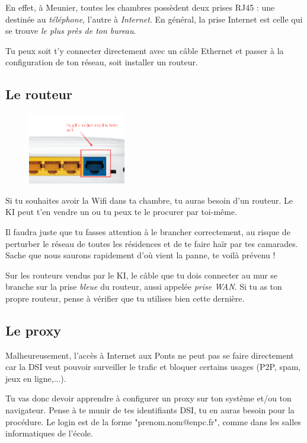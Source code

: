 \documentclass{../templates/enpc-ki/ki019}
\begin{document}
    En effet, à Meunier, toutes les chambres possèdent deux prises RJ45 : une destinée au \emph{téléphone}, l'autre à \emph{Internet}. En général, la prise Internet est celle qui se trouve \emph{le plus près de ton bureau}.

    Tu peux soit t’y connecter directement avec un câble Ethernet et passer à la configuration de ton réseau, soit installer un routeur. %


\bigskip
    \subsection{Le routeur}
    \begin{figure}
      \centering
      \includegraphics[width=0.38\textwidth]{page7}
    \end{figure}
    Si tu souhaites avoir la Wifi dans ta chambre, tu auras besoin d’un routeur. Le KI peut t'en vendre un ou tu peux te le procurer par toi-même.


    Il faudra juste que tu fasses attention à le brancher correctement, au risque de perturber le réseau de toutes les résidences et de te faire haïr par tes camarades. Sache que nous saurons rapidement d’où vient la panne, te voilà prévenu !

    Sur les routeurs vendus par le KI, le câble que tu dois connecter au mur se branche sur la prise \emph{bleue} du routeur, aussi appelée \emph{prise WAN}. Si tu as ton propre routeur, pense à vérifier que tu utilises bien cette dernière.



  \newpage
    \subsection{Le proxy}
    {Malheureusement, l’accès à Internet aux Ponts ne peut pas se faire directement car la DSI veut pouvoir surveiller le trafic et bloquer certains usages (P2P, spam, jeux en ligne,...).}

    Tu vas donc devoir apprendre à configurer un proxy sur ton système et/ou ton navigateur. Pense à te munir de tes identifiants DSI, tu en auras besoin pour la procédure. Le login est de la forme "prenom.nom@enpc.fr", comme dans les salles informatiques de l'école.
\end{document}

